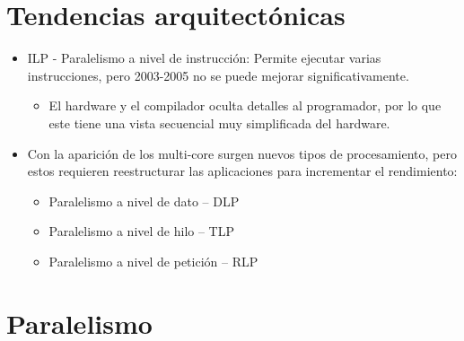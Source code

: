 \documentclass[12pt, twoside, openright]{report} %
\begin{document}
\section{Tendencias arquitectónicas}

\begin{itemize}

	\item ILP - Paralelismo a nivel de instrucción: Permite ejecutar varias
	      instrucciones, pero 2003-2005 no se puede mejorar
	      significativamente.

	      \begin{itemize}

		      \item El hardware y el compilador oculta detalles al programador, por lo
		            que este tiene una vista secuencial muy simplificada del hardware.
	      \end{itemize}
	\item Con la aparición de los multi-core surgen nuevos tipos de
	      procesamiento, pero estos requieren reestructurar las aplicaciones
	      para incrementar el rendimiento:

	      \begin{itemize}

		      \item Paralelismo a nivel de dato -- DLP
		      \item Paralelismo a nivel de hilo -- TLP
		      \item Paralelismo a nivel de petición -- RLP
	      \end{itemize}
\end{itemize}
\vspace{-.5cm}
\section{Paralelismo}
\end{document}
